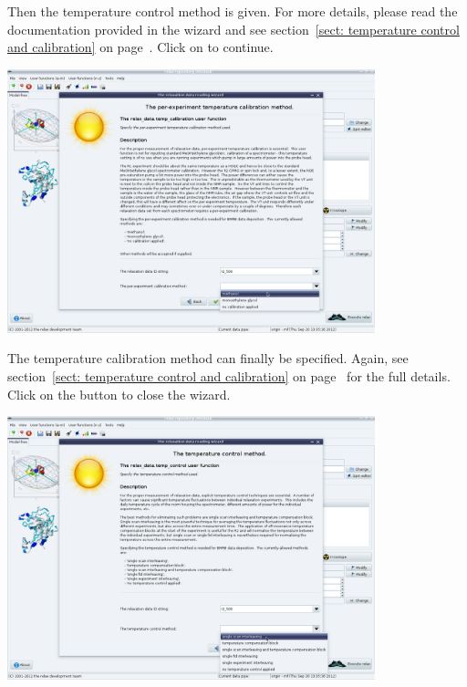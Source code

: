 \begin{htmlonly}
\begin{htmlonly}
Then the temperature control method is given.  For more details, please read the documentation provided in the wizard and see section~\ref{sect: temperature control and calibration} on page~\pageref{sect: temperature control and calibration}.  Click on  to continue.

\begin{minipage}[h]{\linewidth}
\centerline{\includegraphics[width=0.8\textwidth, bb=14 14 1415 1019]{graphics/screenshots/mf_analysis/relax_data_temp_control}}
\end{minipage}

The temperature calibration method can finally be specified.  Again, see section~\ref{sect: temperature control and calibration} on page~\pageref{sect: temperature control and calibration} for the full details.  Click on the  button to close the wizard.

\begin{minipage}[h]{\linewidth}
\centerline{\includegraphics[width=0.8\textwidth, bb=14 14 1415 1019]{graphics/screenshots/mf_analysis/relax_data_temp_calibration}}
\end{minipage}


\end{htmlonly}
\end{htmlonly}
